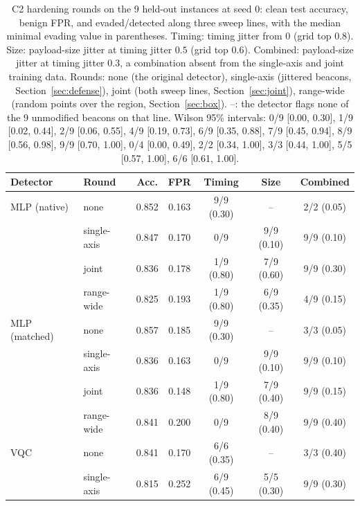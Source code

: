 \documentclass[preprint,12pt]{elsarticle}
\begin{document}
\begin{table}[htbp]
\centering
\caption{C2 hardening rounds on the 9 held-out instances at seed 0: clean test accuracy, benign FPR,
and evaded/detected along three sweep lines, with the median minimal evading value in parentheses.
Timing: timing jitter from 0 (grid top $0.8$). Size: payload-size jitter at timing jitter $0.5$ (grid
top $0.6$). Combined: payload-size jitter at timing jitter $0.3$, a combination absent from the
single-axis and joint training data. Rounds: none (the original detector), single-axis (jittered
beacons, Section~\ref{sec:defense}), joint (both sweep lines, Section~\ref{sec:joint}), range-wide
(random points over the region, Section~\ref{sec:box}). --: the detector flags none of the 9 unmodified
beacons on that line. Wilson 95\% intervals: 0/9 [0.00, 0.30], 1/9 [0.02, 0.44], 2/9 [0.06, 0.55],
4/9 [0.19, 0.73], 6/9 [0.35, 0.88], 7/9 [0.45, 0.94], 8/9 [0.56, 0.98], 9/9 [0.70, 1.00], 0/4 [0.00,
0.49], 2/2 [0.34, 1.00], 3/3 [0.44, 1.00], 5/5 [0.57, 1.00], 6/6 [0.61, 1.00].}
\label{tab:hardening}
\setlength{\tabcolsep}{3pt}\footnotesize
\begin{tabular}{llccccc}
\toprule
Detector & Round & Acc. & FPR & Timing & Size & Combined \\
\midrule
MLP (native)          & none        & 0.852 & 0.163 & 9/9 (0.30) & -- & 2/2 (0.05) \\
                      & single-axis & 0.847 & 0.170 & 0/9 & 9/9 (0.10) & 9/9 (0.10) \\
                      & joint       & 0.836 & 0.178 & 1/9 (0.80) & 7/9 (0.60) & 9/9 (0.30) \\
                      & range-wide  & 0.825 & 0.193 & 1/9 (0.80) & 6/9 (0.35) & 4/9 (0.15) \\
\addlinespace
MLP (matched)         & none        & 0.857 & 0.185 & 9/9 (0.30) & -- & 3/3 (0.05) \\
                      & single-axis & 0.836 & 0.163 & 0/9 & 9/9 (0.10) & 9/9 (0.10) \\
                      & joint       & 0.836 & 0.148 & 1/9 (0.80) & 7/9 (0.40) & 9/9 (0.15) \\
                      & range-wide  & 0.841 & 0.200 & 0/9 & 8/9 (0.40) & 9/9 (0.40) \\
\addlinespace
VQC                   & none        & 0.841 & 0.170 & 6/6 (0.35) & -- & 3/3 (0.40) \\
                      & single-axis & 0.815 & 0.252 & 6/9 (0.45) & 5/5 (0.30) & 9/9 (0.30) \\

\end{tabular}
\end{table}
\end{document}
